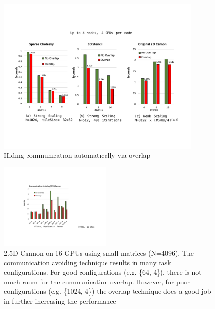 \begin{figure}[htb]
\centering
\includegraphics[width=0.9\textwidth]{figures/overlap.pdf}
\caption{Hiding communication automatically via overlap}
\label{overlap}
\end{figure}

\begin{figure}[htb]
\centering
\includegraphics[width=0.49\textwidth]{figures/CA_4096.pdf}
\caption{2.5D Cannon on 16 GPUs using small matrices (N=4096). The communication avoiding technique results in many task configurations. For good configurations (e.g. \{64, 4\}), there is not much room for the communication overlap. However, for poor configurations (e.g. \{1024, 4\}) the overlap technique does a good job in further increasing the performance}
\label{CA_4096}
\end{figure}

